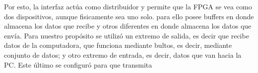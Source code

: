 Por esto, la interfaz actúa como distribuidor y permite que la FPGA se vea como dos dispositivos, aunque fisicamente sea uno solo. para ello posee buffers en donde almacena los datos que recibe y otros diferentes en donde almacena los datos que envía. Para nuestro propósito se utilizó un extremo de salida, es decir que recibe datos de la computadora, que funciona mediante bultos, es decir, mediante conjunto de datos; y otro extremo de entrada, es decir, datos que van hacia la PC. Este último se configuró para que transmita %

